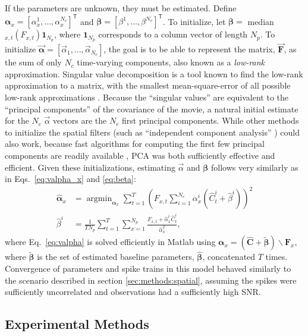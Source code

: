 \documentclass{article}
\providecommand{\ve}[1]{\boldsymbol{#1}}
\newcommand{\T}{^{\ensuremath{\mathsf{T}}}}           %
\DeclareMathOperator*{\argmin}{argmin}
\newcommand{\bF}{\ve{F}}
\newcommand{\vF}{\vec{F}}
\newcommand{\hC}{\widehat{C}}
\newcommand{\hbC}{\widehat{\ve{C}}}
\newcommand{\vbF}{\vec{\ve{F}}}
\newcommand{\balpha}{\ve{\alpha}}
\newcommand{\bbeta}{\ve{\beta}}
\newcommand{\valpha}{\vec{\alpha}}
\newcommand{\vbalpha}{\vec{\balpha}}
\newcommand{\hbalpha}{\widehat{\ve{\alpha}}}
\newcommand{\halpha}{\widehat{\alpha}}
\newcommand{\hbeta}{\widehat{\beta}}
\begin{document}
If the parameters are unknown, they must be estimated. Define $\balpha_x=[\alpha_x^1, \ldots, \alpha_x^{N_c}]\T$ and $\bbeta=[\beta^1, \ldots, \beta^{N_c}]\T$.  To initialize, let $\bbeta=$ median$_{x,t}(F_{x,t})\ve{1}_{N_p}$, where $\ve{1}_{N_p}$ corresponds to a column vector of length $N_p$. To initialize $\vbalpha=[\valpha_1, \ldots, \valpha_{N_c}]$, the goal is to be able to represent the matrix, $\vbF$, as the sum of only $N_c$ time-varying components, also known as a \emph{low-rank} approximation.  Singular value decomposition is a tool known to find the low-rank approximation to a matrix, with the smallest mean-square-error of all possible low-rank approximations \cite{HornJohnson90}.  Because the ``singular values'' are equivalent to the ``principal components'' of the covariance of the movie, a natural initial estimate for the $N_c$ $\valpha$ vectors are the $N_c$ first principal components.  While other methods to initialize the spatial filters (such as ``independent component analysis'' \cite{MukamelSchnitzer09}) could also work, because fast algorithms for computing the first few principal components are readily available \cite{RokhlinTygert09}, PCA was both sufficiently effective and efficient.  Given these initializations, estimating $\valpha$ and $\bbeta$ follows very similarly as in Eqs.~\eqref{eq:valpha_x} and \eqref{eq:beta}:
\begin{align} \label{eq:valpha}
	\hbalpha_x &= \argmin_{\balpha_x} \sum_{t=1}^T  \left(F_{x,t}  \sum_{i=1}^{N_c} \alpha_x^i (\hC_t^i + \hbeta^i)\right)^2 \\
	\hbeta^i &= \frac{1}{T N_p} \sum_{t=1}^T \sum_{x=1}^{N_p} \frac{F_{x,t} + \halpha_x^i  \hC_t^i}{\halpha_x^2}, \label{eq:vbeta}
\end{align}
where Eq.~\eqref{eq:valpha} is solved efficiently in Matlab using $\balpha_x = (\hbC + \widetilde{\bbeta})\backslash \bF_x$, where $\widetilde{\bbeta}$ is the set of estimated baseline parameters, $\widehat{\bbeta}$, concatenated $T$ times.  Convergence of parameters and spike trains in this model behaved similarly to the scenario described in section \ref{sec:methods:spatial}, assuming the spikes were sufficiently uncorrelated and observations had a sufficiently high SNR.





\subsection{Experimental Methods} \label{sec:exp}
\end{document}
